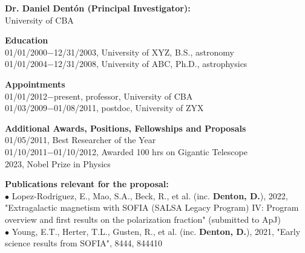 %
\textbf{\color{Blue}\large Dr. Daniel Dent{\'o}n (Principal Investigator):}\\
University of CBA
\par \vspace{-0.5em}
\textbf{Education}\\
01/01/2000$-$12/31/2003, University of XYZ, B.S., astronomy\\
01/01/2004$-$12/31/2008, University of ABC, Ph.D., astrophysics
\par \vspace{-0.5em}
\textbf{Appointments}\\
01/01/2012$-$present, professor, University of CBA\\
01/03/2009$-$01/08/2011, postdoc, University of ZYX
\par \vspace{-0.5em}
\textbf{Additional Awards, Positions, Fellowships and Proposals}\\
01/05/2011, Best Researcher of the Year\\
01/10/2011$-$01/10/2012, Awarded 100 hrs on Gigantic Telescope\\
2023, Nobel Prize in Physics
\par \vspace{-0.5em}
\textbf{Publications relevant for the proposal:}\\
{\scriptsize{$\bullet$}} Lopez-Rodriguez, E., Mao, S.A., Beck, R., et al. (inc. \textbf{Denton, D.}), 2022, "Extragalactic magnetism with SOFIA (SALSA Legacy Program) IV: Program overview and first results on the polarization fraction" (submitted to ApJ)\\
{\scriptsize{$\bullet$}} Young, E.T., Herter, T.L., Gusten, R., et al. (inc. \textbf{Denton, D.}), 2021, "Early science results from SOFIA", 8444, 844410\\
